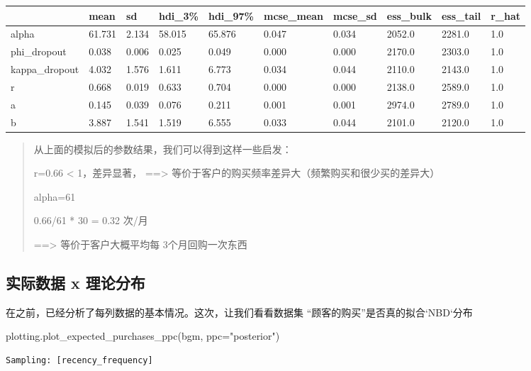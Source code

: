 \documentclass[
]{ctexart}
\newenvironment{Shaded}{\begin{snugshade}}{\end{snugshade}}
\newcommand{\NormalTok}[1]{\textcolor[rgb]{0.00,0.23,0.31}{#1}}
\newcommand{\OperatorTok}[1]{\textcolor[rgb]{0.37,0.37,0.37}{#1}}
\newcommand{\StringTok}[1]{\textcolor[rgb]{0.13,0.47,0.30}{#1}}
\newcounter{none} %
\begin{document}
{\def\LTcaptype{none} %
\begin{longtable}[]{@{}llllllllll@{}}
\toprule\noalign{}
& mean & sd & hdi\_3\% & hdi\_97\% & mcse\_mean & mcse\_sd & ess\_bulk &
ess\_tail & r\_hat \\
\midrule\noalign{}
\endhead
\bottomrule\noalign{}
\endlastfoot
alpha & 61.731 & 2.134 & 58.015 & 65.876 & 0.047 & 0.034 & 2052.0 &
2281.0 & 1.0 \\
phi\_dropout & 0.038 & 0.006 & 0.025 & 0.049 & 0.000 & 0.000 & 2170.0 &
2303.0 & 1.0 \\
kappa\_dropout & 4.032 & 1.576 & 1.611 & 6.773 & 0.034 & 0.044 & 2110.0
& 2143.0 & 1.0 \\
r & 0.668 & 0.019 & 0.633 & 0.704 & 0.000 & 0.000 & 2138.0 & 2589.0 &
1.0 \\
a & 0.145 & 0.039 & 0.076 & 0.211 & 0.001 & 0.001 & 2974.0 & 2789.0 &
1.0 \\
b & 3.887 & 1.541 & 1.519 & 6.555 & 0.033 & 0.044 & 2101.0 & 2120.0 &
1.0 \\
\end{longtable}
}

\begin{quote}
从上面的模拟后的参数结果，我们可以得到这样一些启发：

r=0.66 \textless{} 1，差异显著， ==\textgreater{}
等价于客户的购买频率差异大（频繁购买和很少买的差异大）

alpha=61

0.66/61 * 30 = 0.32 次/月

==\textgreater{} 等价于客户大概平均每 3个月回购一次东西
\end{quote}

\subsection{实际数据 x
理论分布}\label{ux5b9eux9645ux6570ux636e-x-ux7406ux8bbaux5206ux5e03}

在之前，已经分析了每列数据的基本情况。这次，让我们看看数据集
``顾客的购买''是否真的拟合`NBD`分布

\begin{Shaded}
\begin{Highlighting}[]
\NormalTok{plotting.plot\_expected\_purchases\_ppc(bgm, ppc}\OperatorTok{=}\StringTok{"posterior"}\NormalTok{)}
\end{Highlighting}
\end{Shaded}

\begin{verbatim}
Sampling: [recency_frequency]
\end{verbatim}
\end{document}
